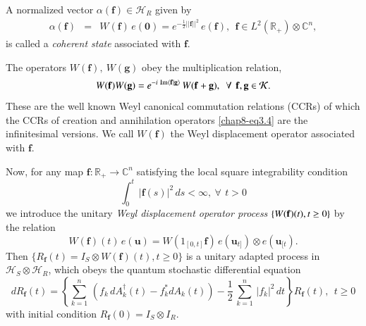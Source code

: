 A normalized vector $\alpha(\mathbf{f})\in\mathcal{H}_R$  given by    
\begin{eqnarray} 
\alpha(\mathbf{f})&=&W(\mathbf{f})\, e(\mathbf{0}) =  e^{-\frac{1}{2} ||\mathbf{f}||^{2}}\, e (\mathbf{f}), \ \ 
\mathbf{f}\in L^2(\mathbb{R_+})\otimes \mathbb{C}^n,    \label{chap8-eq4.6}
\end{eqnarray} 
is called a {\it coherent state} associated with $\mathbf{f}$.  

The operators $W(\mathbf{f}),\ W(\mathbf{g})$ obey the multiplication relation, 
\begin{equation}
W(\mathbf{f}) W(\mathbf{g}) = e^{-i \,\,{\rm Im} \langle \mathbf{f}|\mathbf{g} \rangle}\, W(\mathbf{f}+\mathbf{g}),\ \ \forall\, \ \mathbf{f},\mathbf{g}\in \mathcal{K}. \label{chap8-eq4.7}
\end{equation}
These are the well known Weyl canonical commutation relations (CCRs) of which the CCRs of creation and annihilation operators \eqref{chap8-eq3.4} are the infinitesimal versions. We call  $W(\mathbf{f})$ the Weyl displacement operator associated with $\mathbf{f}.$ 

Now, for any map $\mathbf{f}:\mathbb{R}_+\rightarrow \mathbb{C}^n$ satisfying the local square integrability condition 
$$
\int_0^{t}\,   \vert \mathbf{f}(s)\vert^2 \, ds < \infty, \ \forall\, \ t>0 
$$
we introduce the unitary {\it Weyl displacement operator process} $\{W(\mathbf{f})(t),\break t\geq 0\}$ by the relation  
\begin{equation} 
W(\mathbf{f})(t)\, e(\mathbf{u})= W(1_{[0,t]} \mathbf{f})\, e(\mathbf{u}_{t]}) \otimes e(\mathbf{u}_{[t}). \label{chap8-eq4.8}
\end{equation} 
Then $\{R_{\mathbf{f}}(t)=I_S\otimes W(\mathbf{f})(t), t\geq 0\}$ is a unitary adapted  process in $\mathcal{H}_S\otimes \mathcal{H}_R$, which obeys the quantum stochastic differential equation 
{\fontsize{9pt}{11pt}\selectfont
\begin{equation}
dR_{\mathbf{f}}(t)=\left\{\sum_{k=1}^n\, \left(f_k\, dA^\dag_k(t) - f_k^* dA_k(t) \right) -\frac{1}{2}\,\sum_{k=1}^n\, \vert f_k\vert^2\, dt \right\}\! R_{\mathbf{f}}(t),\ \ t\geq 0 \label{chap8-eq4.9}
\end{equation} }
with  initial condition $R_{\mathbf{f}}(0)=I_S\otimes I_{R}$. 

